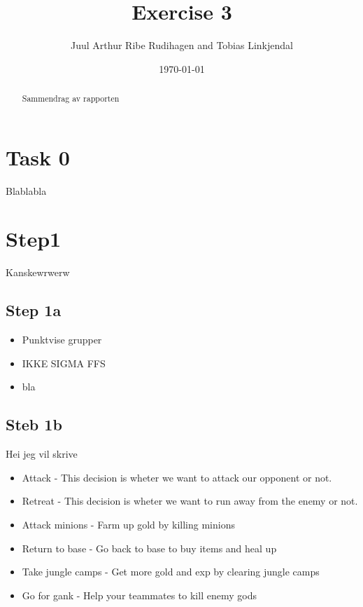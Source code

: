 \documentclass[titlepage]{article}
\author{Juul Arthur Ribe Rudihagen and Tobias Linkjendal}
\title{Exercise 3}
\date{\today}
\begin{document}
\maketitle

\renewcommand{\abstractname}{Summary}
\begin{abstract}
Sammendrag av rapporten
\end{abstract}

\tableofcontents

\newpage


\section{Task 0}
Blablabla

\newpage


\section{Step1}
Kanskewrwerw

\subsection{Step 1a}
\begin{itemize}
\item Punktvise grupper
\item IKKE SIGMA FFS%
\item bla
\end{itemize} 


\subsection{Steb 1b}
Hei jeg vil skrive
\begin{itemize}
\item Attack - This decision is wheter we want to attack our opponent or not.
\item Retreat - This decision is wheter we want to run away from the enemy or not.
\item Attack minions  - Farm up gold by killing minions
\item Return to base - Go back to base to buy items and heal up
\item Take jungle camps - Get more gold and exp by clearing jungle camps
\item Go for gank - Help your teammates to kill enemy gods

\end{itemize}
\end{document}
